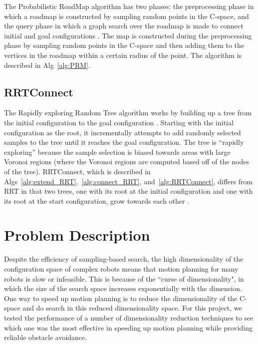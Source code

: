 \documentclass[12pt]{article}
\begin{document}
The Probabilistic RoadMap algorithm has two phases: the preprocessing phase in
which a roadmap is constructed by sampling random points in the C-space, and
the query phase in which a graph search over the roadmap is made to connect
initial and goal configurations \cite{kavraki1996prm}. The map is constructed
during the preprocessing phase by sampling random points in the C-space and
then adding them to the vertices in the roadmap within a certain radius of the
point. The algorithm is described in Alg~\ref{alg:PRM}.

\subsection{RRTConnect}

The Rapidly exploring Random Tree algorithm works by building up a tree from
the initial configuration to the goal configuration \cite{lavalle1998rrt}.
Starting with the initial configuration as the root, it incrementally attempts
to add randomly selected samples to the tree until it reaches the goal
configuration.  The tree is ``rapidly exploring'' because the sample selection
is biased towards areas with large Voronoi regions (where the Voronoi regions
are computed based off of the nodes of the tree). RRTConnect, which is
described in Algs~\ref{alg:extend_RRT},~\ref{alg:connect_RRT},
and~\ref{alg:RRTConnect}, differs from RRT in that two trees, one with its root
at the initial configuration and one with its root at the start configuration,
grow towards each other \cite{kuffner2000rrt}.

\section{Problem Description}

Despite the efficiency of sampling-based search, the high dimensionality of the
configuration space of complex robots means that motion planning for many
robots is slow or infeasible. This is because of the ``curse of dimensionality",
in which the size of the search space increases exponentially with the
dimension. One way to speed up motion planning is to reduce the dimensionality
of the C-space and do search in this reduced dimensionality space. For this
project, we tested the performance of a number of dimensionality reduction
techniques to see which one was the most effective in speeding up motion
planning while providing reliable obstacle avoidance.
\end{document}
